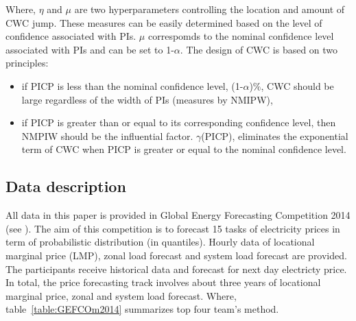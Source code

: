 \documentclass[review]{elsarticle}
\begin{document}
    Where, $\eta$ and $\mu$ are two hyperparameters controlling the location and amount of CWC jump. These measures can be easily determined based on the level of confidence associated with PIs. $\mu$ correspomds to the nominal confidence level associated with PIs and can be set to 1-$\alpha$. The design of CWC is based on two principles:

    \begin{itemize}
      \item if PICP is less than the nominal confidence level, (1-$\alpha$)$\%$, CWC should be large regardless of the width of PIs (measures by NMIPW),
      \item if PICP is greater than or equal to its corresponding confidence level, then NMPIW should be the influential factor. $\gamma$(PICP), eliminates the exponential term of CWC when PICP is greater or equal to the nominal confidence level.
    \end{itemize}

  \subsection{Data description}
    All data in this paper is provided in Global Energy Forecasting Competition 2014 (see \cite{Hong2016}). The aim of this competition is to forecast 15 tasks of electricity prices in term of probabilistic distribution (in quantiles). Hourly data of locational marginal price (LMP), zonal load forecast and system load forecast are provided. The participants receive historical data and forecast for next day electricty price. In total, the price forecasting track involves about three years of locational marginal price, zonal and system load forecast. Where, table~\ref{table:GEFCOm2014} summarizes top four team's method.
\end{document}
